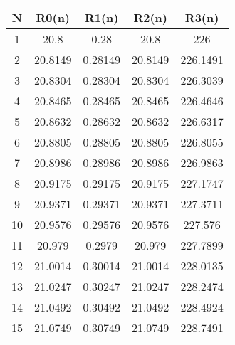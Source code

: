 \begin{tabular}{|c|c|c|c|c|}
\hline
\textbf{N}&\textbf{R0(n)}&\textbf{R1(n)}&\textbf{R2(n)}&\textbf{R3(n)}\\\hline
1&20.8&0.28&20.8&226\\\hline
2&20.8149&0.28149&20.8149&226.1491\\\hline
3&20.8304&0.28304&20.8304&226.3039\\\hline
4&20.8465&0.28465&20.8465&226.4646\\\hline
5&20.8632&0.28632&20.8632&226.6317\\\hline
6&20.8805&0.28805&20.8805&226.8055\\\hline
7&20.8986&0.28986&20.8986&226.9863\\\hline
8&20.9175&0.29175&20.9175&227.1747\\\hline
9&20.9371&0.29371&20.9371&227.3711\\\hline
10&20.9576&0.29576&20.9576&227.576\\\hline
11&20.979&0.2979&20.979&227.7899\\\hline
12&21.0014&0.30014&21.0014&228.0135\\\hline
13&21.0247&0.30247&21.0247&228.2474\\\hline
14&21.0492&0.30492&21.0492&228.4924\\\hline
15&21.0749&0.30749&21.0749&228.7491\\\hline
\end{tabular}
